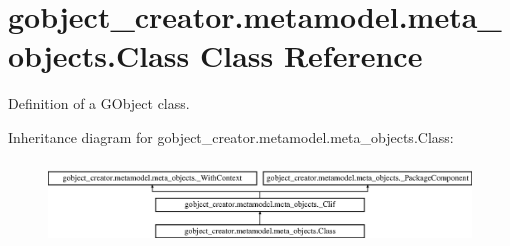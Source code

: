 \hypertarget{classgobject__creator_1_1metamodel_1_1meta__objects_1_1Class}{
\section{gobject\_\-creator.metamodel.meta\_\-objects.Class Class Reference}
\label{classgobject__creator_1_1metamodel_1_1meta__objects_1_1Class}
}


Definition of a GObject class.  


Inheritance diagram for gobject\_\-creator.metamodel.meta\_\-objects.Class:\begin{figure}[H]
\begin{center}
\leavevmode
\includegraphics[height=2.25806cm]{classgobject__creator_1_1metamodel_1_1meta__objects_1_1Class}
\end{center}
\end{figure}
